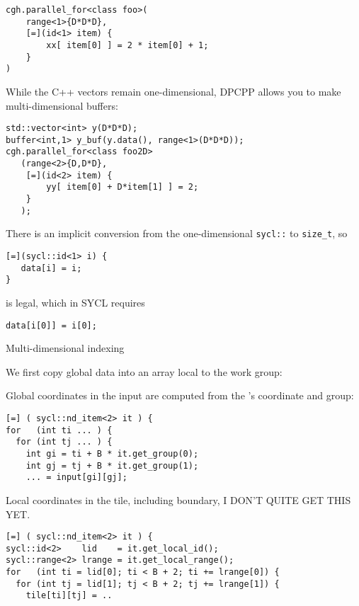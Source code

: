 \begin{lstlisting}
cgh.parallel_for<class foo>(
    range<1>{D*D*D},
    [=](id<1> item) {
        xx[ item[0] ] = 2 * item[0] + 1;
    }
)
\end{lstlisting}

While the C++ vectors remain one-dimensional,
\ac{DPCPP} allows you to make multi-dimensional buffers:
\begin{lstlisting}
std::vector<int> y(D*D*D);
buffer<int,1> y_buf(y.data(), range<1>(D*D*D));
cgh.parallel_for<class foo2D>
   (range<2>{D,D*D},
    [=](id<2> item) {
        yy[ item[0] + D*item[1] ] = 2;
    }
   );
\end{lstlisting}

\begin{dpcppnote}
  There is an implicit conversion from the one-dimensional
  \lstinline+sycl::+
  to \lstinline+size_t+, so
\begin{lstlisting}
[=](sycl::id<1> i) {
   data[i] = i;
}
\end{lstlisting}
is legal, which in SYCL requires
\begin{lstlisting}
data[i[0]] = i[0];
\end{lstlisting}
\end{dpcppnote}

 {Multi-dimensional indexing}



We first copy global data into an array local to the work group:
%

Global coordinates in the input are computed from the
 's coordinate and group:
\begin{lstlisting}
[=] ( sycl::nd_item<2> it ) {
for   (int ti ... ) {
  for (int tj ... ) {
    int gi = ti + B * it.get_group(0);
    int gj = tj + B * it.get_group(1);
    ... = input[gi][gj];
\end{lstlisting}

Local coordinates in the tile, including boundary,
I DON'T QUITE GET THIS YET.
\begin{lstlisting}
[=] ( sycl::nd_item<2> it ) {
sycl::id<2>    lid    = it.get_local_id();
sycl::range<2> lrange = it.get_local_range();
for   (int ti = lid[0]; ti < B + 2; ti += lrange[0]) {
  for (int tj = lid[1]; tj < B + 2; tj += lrange[1]) {
    tile[ti][tj] = ..
\end{lstlisting}

